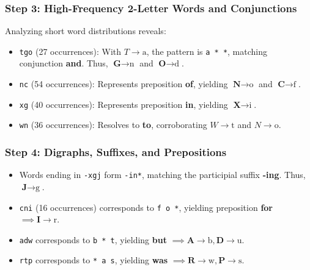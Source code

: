 \documentclass[12pt,a4paper]{article}
\begin{document}
\subsubsection{Step 3: High-Frequency 2-Letter Words and Conjunctions}
Analyzing short word distributions reveals:
\begin{itemize}
    \item \texttt{tgo} (27 occurrences): With $T \to \text{a}$, the pattern is \texttt{a * *}, matching conjunction \textbf{and}. Thus, $\textbf{G} \to \text{n}$ and $\textbf{O} \to \text{d}$.
    \item \texttt{nc} (54 occurrences): Represents preposition \textbf{of}, yielding $\textbf{N} \to \text{o}$ and $\textbf{C} \to \text{f}$.
    \item \texttt{xg} (40 occurrences): Represents preposition \textbf{in}, yielding $\textbf{X} \to \text{i}$.
    \item \texttt{wn} (36 occurrences): Resolves to \textbf{to}, corroborating $W \to \text{t}$ and $N \to \text{o}$.
\end{itemize}

\subsubsection{Step 4: Digraphs, Suffixes, and Prepositions}
\begin{itemize}
    \item Words ending in \texttt{-xgj} form \texttt{-in*}, matching the participial suffix \textbf{-ing}. Thus, $\textbf{J} \to \text{g}$.
    \item \texttt{cni} (16 occurrences) corresponds to \texttt{f o *}, yielding preposition \textbf{for} $\implies \textbf{I} \to \text{r}$.
    \item \texttt{adw} corresponds to \texttt{b * t}, yielding \textbf{but} $\implies \textbf{A} \to \text{b}, \textbf{D} \to \text{u}$.
    \item \texttt{rtp} corresponds to \texttt{* a s}, yielding \textbf{was} $\implies \textbf{R} \to \text{w}, \textbf{P} \to \text{s}$.
\end{itemize}
\end{document}
